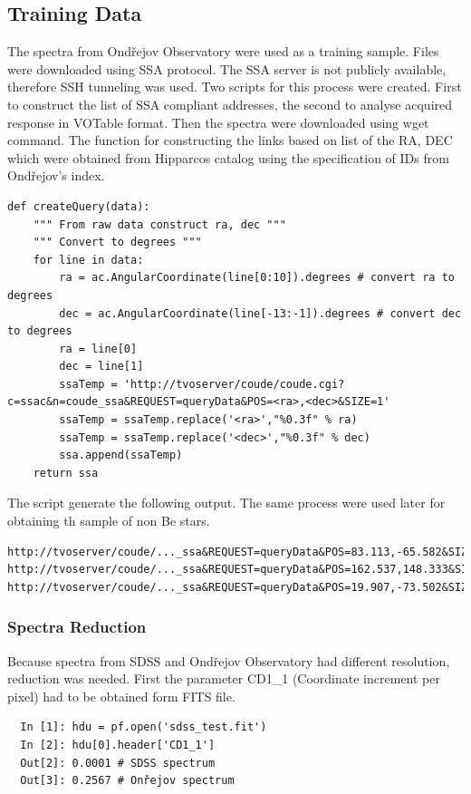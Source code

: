 \subsection{Training Data}
The spectra from Ondřejov Observatory were used as a training
sample. Files were downloaded using SSA protocol. The SSA server is
not publicly available, therefore SSH tunneling was used. Two scripts
for this process were created. First to construct the list of SSA
compliant addresses, the second to analyse acquired response in
VOTable format. Then the spectra were downloaded using wget
command. The function for constructing the links based on list of the
RA, DEC which were obtained from Hipparcos catalog using the
specification of IDs from Ondřejov's index.

\begin{lstlisting}
def createQuery(data):
    """ From raw data construct ra, dec """
    """ Convert to degrees """
    for line in data:
        ra = ac.AngularCoordinate(line[0:10]).degrees # convert ra to degrees
        dec = ac.AngularCoordinate(line[-13:-1]).degrees # convert dec to degrees
        ra = line[0]
        dec = line[1]
        ssaTemp = 'http://tvoserver/coude/coude.cgi?c=ssac&n=coude_ssa&REQUEST=queryData&POS=<ra>,<dec>&SIZE=1'
        ssaTemp = ssaTemp.replace('<ra>',"%0.3f" % ra)
        ssaTemp = ssaTemp.replace('<dec>',"%0.3f" % dec)
        ssa.append(ssaTemp)
    return ssa
\end{lstlisting}

The script generate the following output. The same process were used
later for obtaining th sample of non Be stars.

\begin{lstlisting}
http://tvoserver/coude/..._ssa&REQUEST=queryData&POS=83.113,-65.582&SIZE=60
http://tvoserver/coude/..._ssa&REQUEST=queryData&POS=162.537,148.333&SIZE=60
http://tvoserver/coude/..._ssa&REQUEST=queryData&POS=19.907,-73.502&SIZE=60
\end{lstlisting}


\subsubsection{Spectra Reduction}
Because spectra from SDSS and Ondřejov Observatory had different
resolution, reduction was needed. First the parameter CD1\_1 (Coordinate
increment per pixel) had to be obtained form FITS file.


\begin{lstlisting}
  In [1]: hdu = pf.open('sdss_test.fit')
  In [2]: hdu[0].header['CD1_1']
  Out[2]: 0.0001 # SDSS spectrum 
  Out[3]: 0.2567 # Onřejov spectrum
\end{lstlisting}

